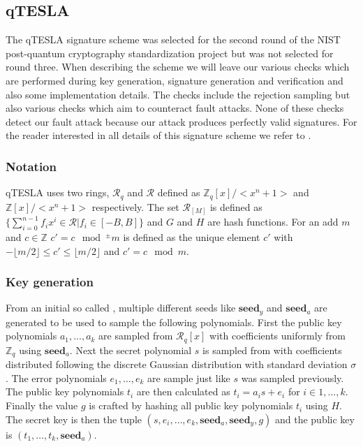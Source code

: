 \documentclass[a4paper,titlepage]{article}
\begin{document}
\subsection{qTESLA}
The qTESLA signature scheme \cite{qtesla} was selected for the second round of the NIST post-quantum cryptography standardization project but was not selected for round three.
When describing the scheme we will leave our various checks which are performed during key generation, signature generation and verification and also some implementation details. The checks include the rejection sampling
but also various checks which aim to counteract fault attacks. None of these checks detect our fault attack because our attack produces perfectly valid signatures. For the reader interested in all details of this signature scheme we refer to \cite{qtesla}.

\subsubsection{Notation}
qTESLA uses two rings, $\mathcal{R}_{q}$ and $\mathcal{R}$ defined as $\mathds{Z}_{q}[x] / <x^{n} + 1>$ and $\mathds{Z}[x] / <x^{n} + 1>$ respectively. The set $\mathcal{R}_{[M]}$ is defined as $\{\sum_{i=0}^{n-1}f_{i}x^{i} \in \mathcal{R} \vert f_{i} \in [-B, B]\}$ and $G$ and $H$ are hash functions. For an add $m$ and $c \in \mathds{Z}$ $c' = c \mod^{\pm} m$ is defined as the unique element $c'$ with $-\lfloor m/2 \rfloor  \leq c' \leq \lfloor m/2 \rfloor$ and $c' = c \mod m$.


\subsubsection{Key generation}
From an initial so called , multiple different seeds like $\textbf{seed}_{y}$ and  $\textbf{seed}_{a}$ are generated to be used to sample the following polynomials.
First the public key polynomials $a_{1}, \ldots, a_{k}$ are sampled from $\mathcal{R}_{q}[x]$ with coefficients uniformly from $\mathds{Z}_{q}$ using $\textbf{seed}_{a}$.
Next the secret polynomial $s$ is sampled from with coefficients distributed following the discrete Gaussian distribution with standard deviation $\sigma$.
The error polynomials $e_{1}, \ldots, e_{k}$ are sample just like $s$ was sampled previously.
The public key polynomials $t_{i}$ are then calculated as $t_{i} = a_{i} s + e_{i}$ for $i \in {1, \ldots, k}$.
Finally the value $g$ is crafted by hashing all public key polynomials $t_{i}$ using $H$.
The secret key is then the tuple $(s, e_{i}, \ldots, e_{k}, \textbf{seed}_{a},  \textbf{seed}_{y}, g)$ and the public key is $(t_{1}, \ldots, t_{k},  \textbf{seed}_{a})$.
\end{document}
